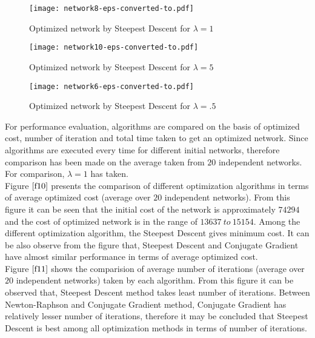 \documentclass[11pt]{article}
\numberwithin{equation}{section}
\begin{document}
\begin{figure*}[htb!]
\begin{center}
\texttt{[image: network8-eps-converted-to.pdf]}
\end{center}
\caption{Optimized network by Steepest Descent for $ \lambda =1$}\label{f7}
\end{figure*}
\begin{figure*}[htb!]
\begin{center}
\texttt{[image: network10-eps-converted-to.pdf]}
\end{center}
\caption{Optimized network by Steepest Descent for $ \lambda =5 $}\label{f8}
\end{figure*}
\begin{figure*}[htb!]
\begin{center}
\texttt{[image: network6-eps-converted-to.pdf]}
\end{center}
\caption{Optimized network by Steepest Descent for $ \lambda =.5$}\label{f9}
\end{figure*}
\newpage
For performance evaluation, algorithms are compared on the basis of optimized cost, number of iteration and total time taken to get an optimized network. Since algorithms are executed every time for different initial networks, therefore comparison has been made on the average taken from $20$ independent networks. For comparison, $\lambda=1$ has taken.\\

Figure $\ref{f10}$ presents the comparison of different optimization algorithms in terms of average optimized cost (average over $20$ independent networks). From this figure it can be seen that the initial cost of the network is approximately $74294$ and the cost of optimized network is in the range of $13637~to~15154$. Among the different optimization algorithm, the Steepest Descent gives minimum cost. It can be also observe from the figure that, Steepest Descent and Conjugate Gradient have almost similar performance in terms of average optimized cost.\\

Figure $\ref{f11}$ shows the comparision of average number of iterations (average over $20$ independent networks) taken by each algorithm. From this figure it can be observed that, Steepest Descent method takes least number of iterations. Between Newton-Raphson and Conjugate Gradient method, Conjugate Gradient has relatively lesser number of iterations, therefore it may be concluded that Steepest Descent is best among all optimization methods in terms of number of iterations.\\
\end{document}
